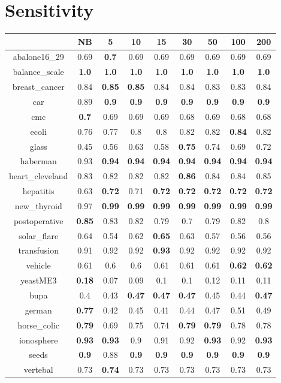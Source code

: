 \documentclass{article}%
\begin{document}
%
\section*{Sensitivity}%
\begin{tabular}{c|cccccccc}%
\hline%
&NB&5&10&15&30&50&100&200\\%
\hline%
abalone16\_29&0.69&\textbf{0.7}&0.69&0.69&0.69&0.69&0.69&0.69\\%
\hline%
balance\_scale&\textbf{1.0}&\textbf{1.0}&\textbf{1.0}&\textbf{1.0}&\textbf{1.0}&\textbf{1.0}&\textbf{1.0}&\textbf{1.0}\\%
\hline%
breast\_cancer&0.84&\textbf{0.85}&\textbf{0.85}&0.84&0.84&0.83&0.83&0.84\\%
\hline%
car&0.89&\textbf{0.9}&\textbf{0.9}&\textbf{0.9}&\textbf{0.9}&\textbf{0.9}&\textbf{0.9}&\textbf{0.9}\\%
\hline%
cmc&\textbf{0.7}&0.69&0.69&0.69&0.68&0.69&0.68&0.68\\%
\hline%
ecoli&0.76&0.77&0.8&0.8&0.82&0.82&\textbf{0.84}&0.82\\%
\hline%
glass&0.45&0.56&0.63&0.58&\textbf{0.75}&0.74&0.69&0.72\\%
\hline%
haberman&0.93&\textbf{0.94}&\textbf{0.94}&\textbf{0.94}&\textbf{0.94}&\textbf{0.94}&\textbf{0.94}&\textbf{0.94}\\%
\hline%
heart\_cleveland&0.83&0.82&0.82&0.82&\textbf{0.86}&0.84&0.84&0.85\\%
\hline%
hepatitis&0.63&\textbf{0.72}&0.71&\textbf{0.72}&\textbf{0.72}&\textbf{0.72}&\textbf{0.72}&\textbf{0.72}\\%
\hline%
new\_thyroid&0.97&\textbf{0.99}&\textbf{0.99}&\textbf{0.99}&\textbf{0.99}&\textbf{0.99}&\textbf{0.99}&\textbf{0.99}\\%
\hline%
postoperative&\textbf{0.85}&0.83&0.82&0.79&0.7&0.79&0.82&0.8\\%
\hline%
solar\_flare&0.64&0.54&0.62&\textbf{0.65}&0.63&0.57&0.56&0.56\\%
\hline%
transfusion&0.91&0.92&0.92&\textbf{0.93}&0.92&0.92&0.92&0.92\\%
\hline%
vehicle&0.61&0.6&0.6&0.61&0.61&0.61&\textbf{0.62}&\textbf{0.62}\\%
\hline%
yeastME3&\textbf{0.18}&0.07&0.09&0.1&0.1&0.12&0.11&0.11\\%
\hline%
bupa&0.4&0.43&\textbf{0.47}&\textbf{0.47}&\textbf{0.47}&0.45&0.44&\textbf{0.47}\\%
\hline%
german&\textbf{0.77}&0.42&0.45&0.41&0.44&0.47&0.51&0.49\\%
\hline%
horse\_colic&\textbf{0.79}&0.69&0.75&0.74&\textbf{0.79}&\textbf{0.79}&0.78&0.78\\%
\hline%
ionosphere&\textbf{0.93}&\textbf{0.93}&0.9&0.91&0.92&\textbf{0.93}&0.92&\textbf{0.93}\\%
\hline%
seeds&\textbf{0.9}&0.88&\textbf{0.9}&\textbf{0.9}&\textbf{0.9}&\textbf{0.9}&\textbf{0.9}&\textbf{0.9}\\%
\hline%
vertebal&0.73&\textbf{0.74}&0.73&0.73&0.73&0.73&0.73&0.73\\%
\hline%
\end{tabular}
\end{document}
